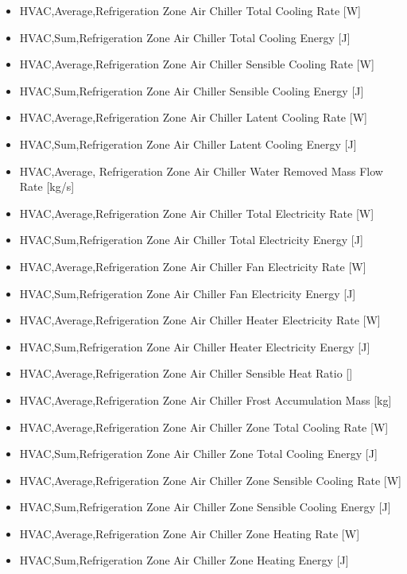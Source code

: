 \begin{itemize}
\item
  HVAC,Average,Refrigeration Zone Air Chiller Total Cooling Rate {[}W{]}
\item
  HVAC,Sum,Refrigeration Zone Air Chiller Total Cooling Energy {[}J{]}
\item
  HVAC,Average,Refrigeration Zone Air Chiller Sensible Cooling Rate {[}W{]}
\item
  HVAC,Sum,Refrigeration Zone Air Chiller Sensible Cooling Energy {[}J{]}
\item
  HVAC,Average,Refrigeration Zone Air Chiller Latent Cooling Rate {[}W{]}
\item
  HVAC,Sum,Refrigeration Zone Air Chiller Latent Cooling Energy {[}J{]}
\item
  HVAC,Average, Refrigeration Zone Air Chiller Water Removed Mass Flow Rate {[}kg/s{]}
\item
  HVAC,Average,Refrigeration Zone Air Chiller Total Electricity Rate {[}W{]}
\item
  HVAC,Sum,Refrigeration Zone Air Chiller Total Electricity Energy {[}J{]}
\item
  HVAC,Average,Refrigeration Zone Air Chiller Fan Electricity Rate {[}W{]}
\item
  HVAC,Sum,Refrigeration Zone Air Chiller Fan Electricity Energy {[}J{]}
\item
  HVAC,Average,Refrigeration Zone Air Chiller Heater Electricity Rate {[}W{]}
\item
  HVAC,Sum,Refrigeration Zone Air Chiller Heater Electricity Energy {[}J{]}
\item
  HVAC,Average,Refrigeration Zone Air Chiller Sensible Heat Ratio {[]}
\item
  HVAC,Average,Refrigeration Zone Air Chiller Frost Accumulation Mass {[}kg{]}
\item
  HVAC,Average,Refrigeration Zone Air Chiller Zone Total Cooling Rate {[}W{]}
\item
  HVAC,Sum,Refrigeration Zone Air Chiller Zone Total Cooling Energy {[}J{]}
\item
  HVAC,Average,Refrigeration Zone Air Chiller Zone Sensible Cooling Rate {[}W{]}
\item
  HVAC,Sum,Refrigeration Zone Air Chiller Zone Sensible Cooling Energy {[}J{]}
\item
  HVAC,Average,Refrigeration Zone Air Chiller Zone Heating Rate {[}W{]}
\item
  HVAC,Sum,Refrigeration Zone Air Chiller Zone Heating Energy {[}J{]}
\end{itemize}

